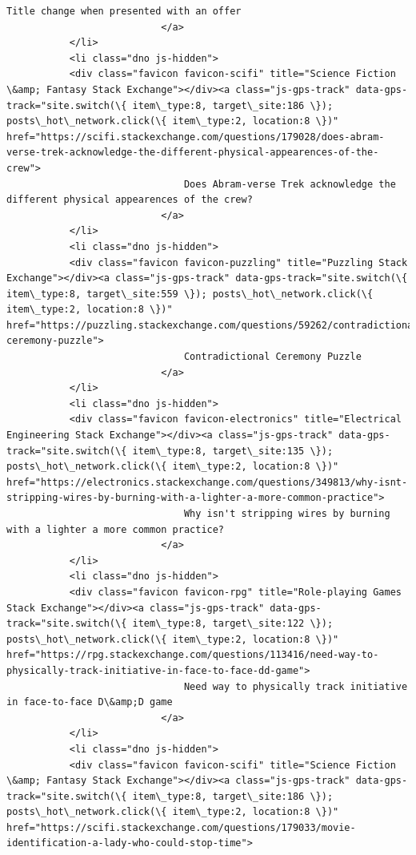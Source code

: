 \documentclass[11pt]{article}
\begin{document}
\begin{Verbatim}[commandchars=\\\{\}]
                               Title change when presented with an offer
                           </a>
           </li>
           <li class="dno js-hidden">
           <div class="favicon favicon-scifi" title="Science Fiction \&amp; Fantasy Stack Exchange"></div><a class="js-gps-track" data-gps-track="site.switch(\{ item\_type:8, target\_site:186 \}); posts\_hot\_network.click(\{ item\_type:2, location:8 \})" href="https://scifi.stackexchange.com/questions/179028/does-abram-verse-trek-acknowledge-the-different-physical-appearences-of-the-crew">
                               Does Abram-verse Trek acknowledge the different physical appearences of the crew?
                           </a>
           </li>
           <li class="dno js-hidden">
           <div class="favicon favicon-puzzling" title="Puzzling Stack Exchange"></div><a class="js-gps-track" data-gps-track="site.switch(\{ item\_type:8, target\_site:559 \}); posts\_hot\_network.click(\{ item\_type:2, location:8 \})" href="https://puzzling.stackexchange.com/questions/59262/contradictional-ceremony-puzzle">
                               Contradictional Ceremony Puzzle
                           </a>
           </li>
           <li class="dno js-hidden">
           <div class="favicon favicon-electronics" title="Electrical Engineering Stack Exchange"></div><a class="js-gps-track" data-gps-track="site.switch(\{ item\_type:8, target\_site:135 \}); posts\_hot\_network.click(\{ item\_type:2, location:8 \})" href="https://electronics.stackexchange.com/questions/349813/why-isnt-stripping-wires-by-burning-with-a-lighter-a-more-common-practice">
                               Why isn't stripping wires by burning with a lighter a more common practice?
                           </a>
           </li>
           <li class="dno js-hidden">
           <div class="favicon favicon-rpg" title="Role-playing Games Stack Exchange"></div><a class="js-gps-track" data-gps-track="site.switch(\{ item\_type:8, target\_site:122 \}); posts\_hot\_network.click(\{ item\_type:2, location:8 \})" href="https://rpg.stackexchange.com/questions/113416/need-way-to-physically-track-initiative-in-face-to-face-dd-game">
                               Need way to physically track initiative in face-to-face D\&amp;D game
                           </a>
           </li>
           <li class="dno js-hidden">
           <div class="favicon favicon-scifi" title="Science Fiction \&amp; Fantasy Stack Exchange"></div><a class="js-gps-track" data-gps-track="site.switch(\{ item\_type:8, target\_site:186 \}); posts\_hot\_network.click(\{ item\_type:2, location:8 \})" href="https://scifi.stackexchange.com/questions/179033/movie-identification-a-lady-who-could-stop-time">

\end{Verbatim}
\end{document}
